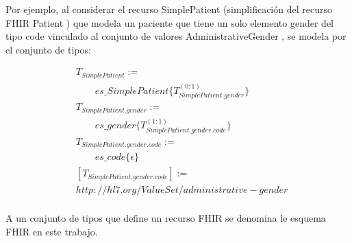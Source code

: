 Por ejemplo, al considerar el recurso SimplePatient (simplificación del recurso FHIR Patient \cite{FHIRPatient}) que modela un paciente que tiene un solo elemento gender del tipo code \cite{FHIRDataTypes} vinculado al conjunto de valores AdministrativeGender \cite{FHIRAdministrativeGender}, se modela por el conjunto de tipos:

\begin{align*}
&T_{SimplePatient}:= \\
&\qquad es\_SimplePatient\{T_{SimplePatient.gender}^{(0:1)}\} \\
&T_{SimplePatient.gender}:= \\
&\qquad es\_gender\{T_{SimplePatient.gender.code}^{(1:1)}\} \\
&T_{SimplePatient.gender.code}:= \\
&\qquad es\_code\{\epsilon\} \\
&[T_{SimplePatient.gender.code}] := \\
& http://hl7.org/ValueSet/administrative-gender \\
\end{align*}

A un conjunto de tipos que define un recurso FHIR se denomina le esquema FHIR en este trabajo.
